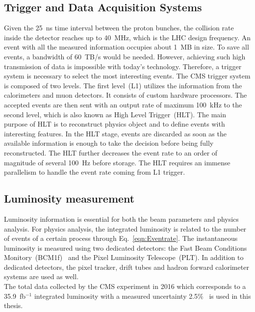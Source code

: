 \subsection{Trigger and Data Acquisition Systems }
Given the 25~ns time interval between the proton bunches, the collision rate inside the detector reaches up to 40~MHz, which is the LHC design frequency. An event with all the measured information occupies about 1~MB in size. To save all events, a bandwidth of 60~TB/s would be needed. However, achieving such high transmission of data is impossible with today’s technology. Therefore, a trigger system is necessary to select the most interesting events. The CMS trigger system is composed of two levels. The first level~(L1) utilizes the information from the calorimeters and muon detectors. It consists of custom hardware processors. The accepted events are then sent with an output rate of maximum 100~kHz to the second level, which is also known as High Level Trigger~(HLT). The main purpose of HLT is to reconstruct physics object and to define events with interesting features. In the HLT stage, events are discarded as soon as the available information is enough to take the decision before being fully reconstructed. The HLT further decreases the event rate to an order of magnitude of several 100~Hz before storage. The HLT requires an immense parallelism to handle the event rate coming from L1 trigger.
\subsection{Luminosity measurement}
\label{sec:luminosity}
Luminosity information is essential for both the beam parameters and physics analysis. For physics analysis, the integrated luminosity is related to the number of events of a certain process through Eq.~\ref{eqn:Eventrate}. The instantaneous luminosity is measured using two dedicated detectors: the Fast Beam Conditions Monitory~(BCM1f)~\cite{LUMTECH} and the Pixel Luminosity Telescope~(PLT).  In addition to dedicated detectors, the pixel tracker, drift tubes and hadron forward calorimeter systems are used as well. \\
The total data collected by the CMS experiment in 2016 which corresponds to a 35.9~fb$^{-1}$ integrated luminosity with a measured uncertainty 2.5\%~\cite{lumi1} is used in this thesis.
